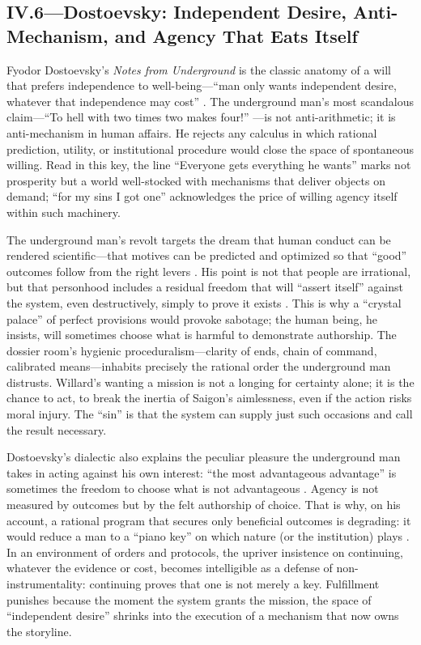 \subsection*{IV.6—Dostoevsky: Independent Desire, Anti-Mechanism, and Agency That Eats Itself}
\label{ssec:iii-dostoevsky}
Fyodor Dostoevsky's \emph{Notes from Underground} is the classic anatomy of a will that prefers
independence to well-being—``man only wants independent desire, whatever that independence may
cost'' \parencite[p.~131]{DostoevskyNFU1994}. The underground man's most scandalous claim—``To
hell with two times two makes four!'' \parencite[p.~129]{DostoevskyNFU1994}—is not
anti-arithmetic; it is anti-mechanism in human affairs. He rejects any calculus in which
rational prediction, utility, or institutional procedure would close the space of spontaneous
willing. Read in this key, the line ``Everyone gets everything he wants'' marks not prosperity
but a world well-stocked with mechanisms that deliver objects on demand; ``for my sins I got
one'' acknowledges the price of willing agency itself within such machinery.

The underground man's revolt targets the dream that human conduct can be rendered scientific—that
motives can be predicted and optimized so that ``good'' outcomes follow from the right levers
\parencite[pp.~120--132]{DostoevskyNFU1994}. His point is not that people are irrational, but
that personhood includes a residual freedom that will ``assert itself'' against the system,
even destructively, simply to prove it exists \parencite[pp.~129--132]{DostoevskyNFU1994}.
This is why a ``crystal palace'' of perfect provisions would provoke sabotage; the human being,
he insists, will sometimes choose what is harmful to demonstrate authorship. The dossier room's
hygienic proceduralism—clarity of ends, chain of command, calibrated means—inhabits precisely
the rational order the underground man distrusts. Willard's wanting a mission is not a longing
for certainty alone; it is the chance to act, to break the inertia of Saigon's aimlessness,
even if the action risks moral injury. The ``sin'' is that the system can supply just such
occasions and call the result necessary.

Dostoevsky's dialectic also explains the peculiar pleasure the underground man takes in acting
against his own interest: ``the most advantageous advantage'' is sometimes the freedom to choose
what is not advantageous \parencite[pp.~129--131]{DostoevskyNFU1994}. Agency is not measured by
outcomes but by the felt authorship of choice. That is why, on his account, a rational program
that secures only beneficial outcomes is degrading: it would reduce a man to a ``piano key'' on
which nature (or the institution) plays \parencite[pp.~115--120]{DostoevskyNFU1994}.
In an environment of orders and protocols, the upriver insistence on continuing, whatever the
evidence or cost, becomes intelligible as a defense of non-instrumentality: continuing proves
that one is not merely a key. Fulfillment punishes because the moment the system grants the
mission, the space of ``independent desire'' shrinks into the execution of a mechanism that
now owns the storyline.

